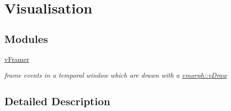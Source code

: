 \hypertarget{group__visualisation}{\section{Visualisation}
\label{group__visualisation}
}
\subsection*{Modules}
\begin{DoxyCompactItemize}
\item 
\hyperlink{group__vFramer}{v\-Framer}
\begin{DoxyCompactList}\small\item\em frame events in a temporal window which are drawn with a \hyperlink{classemorph_1_1vDraw}{emorph\-::v\-Draw} \end{DoxyCompactList}\end{DoxyCompactItemize}


\subsection{Detailed Description}
